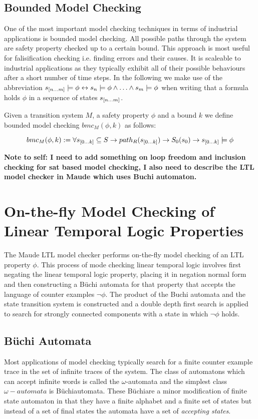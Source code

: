 \subsection*{Bounded Model Checking}
One of the most important model checking techniques in terms of industrial applications is bounded model checking. All possible paths through the system are safety property checked up to a certain bound. This approach is most useful for falisification checking i.e. finding errors and their causes. It is scaleable to industrial applications as they typically exhibit all of their possible behaviours after a short number of time steps. In the following we make use of the abbreviation $s_{{[}n \ldots m {]}} \models \phi \leftrightarrow s_n \models \phi \wedge \ldots \wedge  s_m \models \phi$ when writing that a formula holds $\phi$ in a sequence of states $s_{{[}n \ldots m {]}}$.
\medskip
\begin{mydef}
Given a transition system $M$, a safety property $\phi$ and a bound $k$ we define bounded model checking $bmc_M(\phi,k)$ as follows:

$$bmc_M(\phi,k):= \forall s_{{[}0 \ldots k {]}} \subseteq S \to  path_R(s_{{[}0 \ldots k {]}}) \to S_0(s_0) \to s_{{[}0 \ldots k {]}} \models \phi$$
\end{mydef}
\medskip
\textbf{Note to self: I need to add something on loop freedom and inclusion checking for sat based model checking, I also need to describe the LTL model checker in Maude which uses Buchi automaton.}  

\section{On-the-fly Model Checking of Linear Temporal Logic Properties}
The Maude LTL model checker performs on-the-fly model checking of an LTL property $\phi$.
This process of mode checking linear temporal logic involves first  negating the linear temporal  logic property, placing it in negation normal form and then constructing a B{\"u}chi automata for that property that accepts the language of counter examples $\neg \phi$. The product of the Buchi automata and the state transition system is constructed and a double depth first search is applied to search for strongly connected components with a state in which $\neg \phi$ holds.

\subsection{B{\"u}chi Automata}
\newcommand{\Buchi}{{B{\"u}chi}}
Most applications of model checking typically search for a finite counter example trace in the set of infinite traces of the system. The class of automatons which can accept infinite words is called the $\omega$-automata and the simplest class $\omega-automata$ is \Buchi automata. These \Buchi are a minor modification of finite state automaton in that they have a finite alphabet and a finite set of states but instead of a set of final states the automata have a set of \emph{accepting states}.

